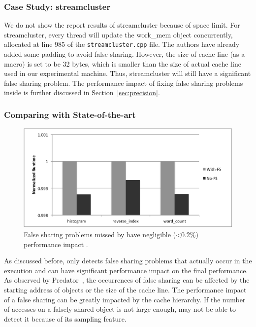 \subsubsection{Case Study: streamcluster}

We do not show the report results of streamcluster because of space limit. For streamcluster, every thread will update the work\_mem object concurrently, allocated at line 985 of the \texttt{streamcluster.cpp} file. The authors have already added some padding to avoid false sharing. However, the size of cache line (as a macro) is set to be 32 bytes, which is smaller than the size of actual cache line used in our experimental machine. Thus, streamcluster will still have a significant false sharing problem. The performance impact of fixing false sharing problems inside is further discussed in Section~\ref{sec:precision}. 


\subsubsection{Comparing with State-of-the-art}

\begin{figure}[htbp]
\centering
\label{fig:fseffectiveness}
\includegraphics[width=1\columnwidth]{figure/trivial.pdf}
\caption{False sharing problems missed by \cheetah{} have negligible (<0.2\%) performance impact .}
\end{figure}

As discussed before, \cheetah{} only detects false sharing problems that actually occur in the execution and can have significant performance impact on the final performance. As observed by Predator~\cite{Predator}, the occurrences of false sharing can be affected by the starting address of objects or the size of the cache line. The performance impact of a false sharing can be greatly impacted by the cache hierarchy. If the number of accesses on a falsely-shared object is not large enough, \cheetah{} may not be able to detect it because of its sampling feature. 

